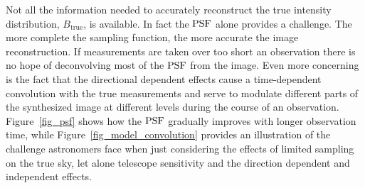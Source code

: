 Not all the information needed to accurately reconstruct the true intensity distribution, $B_{\text{true}}$, is available. In fact the $\textrm{PSF}$ alone provides a challenge. The more complete the sampling function, 
the more accurate the image reconstruction. If measurements are taken over too short an observation there is no hope of deconvolving most of the $\textrm{PSF}$ from the image. Even more concerning is the fact that the 
directional dependent effects cause a time-dependent convolution with the true measurements and serve to modulate different parts of the synthesized image at different levels during the course of an 
observation. Figure~\ref{fig_psf} shows how the $\textrm{PSF}$ gradually improves with longer observation time, while Figure~\ref{fig_model_convolution} provides an illustration of the challenge astronomers face 
when just considering the effects of limited sampling on the true sky, let alone telescope sensitivity and the direction dependent and independent effects.
